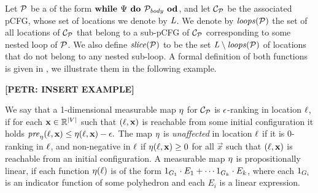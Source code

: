 Let $\mathcal{P}$ be a \PP{} of the form $\textbf{while } \Psi \textbf{ do } 
\mathcal{P}_{\mathit{body}} \textbf{ od}$, and let $\mathcal{C}_{\mathcal{P}}$ be the associated pCFG, whose set of locations we denote by $\mathit{L}$. We denote by $\mathit{loops}(\mathcal{P})$ the set of all locations of $\mathcal{C}_{\mathcal{P}}$ that belong to a sub-pCFG of $\mathcal{C}_{\mathcal{P}}$ corresponding to some nested loop of $\mathcal{P}$. We also define $\mathit{slice}(\mathcal{P})$ to be the set $\mathit{L}\setminus\mathit{loops}(\mathcal{P})$ of locations that do not belong to any nested sub-loop.  A formal definition of 
both functions is given in \AppendixMaterial, we illustrate them in the 
following example.

\textbf{[PETR: INSERT EXAMPLE]}

We say that a 1-dimensional measurable map $\eta$ for $\mathcal{C}_{\mathcal{P}}$ is $\epsilon$-ranking in location $\ell$, if for each $\mathbf{x}\in\mathbb{R}^{|V|}$ such that $(\ell,\mathbf{x}) $ is reachable from some initial configuration it holds $\mathit{pre}_{\eta}(\ell,\mathbf{x})\leq \eta(\ell,\mathbf{x})-\epsilon.$ The map $\eta$ is \emph{unaffected} in location $\ell$ if it is $0$-ranking in $\ell$, and non-negative in $\ell$ if $\eta(\ell,\mathbf{x})\geq 0$ for all $\vec{x}$ such that $(\ell,\mathbf{x})$ is reachable from an initial configuration. A measurable map $\eta$ is propositionally linear, if each function $\eta(\ell)$ is of the form ${1}_{G_1}\cdot E_1 + \cdots {1}_{G_k}\cdot E_k$, where each ${1}_{G_i}$ is an indicator function of some polyhedron and each $E_i$ is a linear expression.

